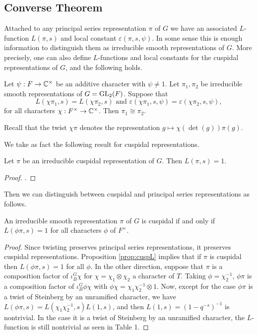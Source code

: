 \subsection{Converse Theorem}

Attached to any principal series representation $\pi$ of $G$ we have an associated $L$-function $L(\pi,s)$ and local constant $\varepsilon(\pi,s,\psi)$. In some sense this is enough information to distinguish them as irreducible smooth representations of $G$. More precisely, one can also define $L$-functions and local constants for the cuspidal representations of $G$, and the following holds.

\begin{thm}\label{thm:converse}
    Let $\psi:F \to \mathbb{C}^\times$ be an additive character with $\psi \neq 1$. Let $\pi_1,\pi_2$ be irreducible smooth representations of $G=\mathrm{GL}_2(F)$. Suppose that 
    $$L(\chi\pi_1,s)=L(\chi\pi_2,s) \text{   and   } \varepsilon(\chi\pi_1,s,\psi) = \varepsilon(\chi\pi_2,s,\psi),$$ for all characters $\chi :F^\times \to \mathbb{C}^\times$. Then $\pi_1 \cong \pi_2$.
\end{thm}

Recall that the twist $\chi\pi$ denotes the representation $g \mapsto \chi(\det(g))\pi(g)$.

We take as fact the following result for cuspidal representations.

\begin{prop}\label{prop:cuspL}
    Let $\pi$ be an irreducible cuspidal representation of $G$. Then $L(\pi,s)=1$.
\end{prop}
\begin{proof}
    \cite[Corollary 24.5]{BH1}.
\end{proof}

Then we can distinguish between cuspidal and principal series representations as follows.

\begin{prop}\label{prop:twistL}
    An irreducible smooth  representation $\pi$ of $G$ is cuspidal if and only if $L(\phi\pi,s)=1$ for all characters $\phi$ of $F^\times$.
\end{prop}
\begin{proof}
    Since twisting preserves principal series representations, it preserves cuspidal representations. Proposition \ref{prop:cuspL} implies that if $\pi$ is cuspidal then $L(\phi\pi,s)=1$ for all $\phi$. In the other direction, suppose that $\pi$ is a composition factor of $\iota_B^G \chi$ for $\chi= \chi_1\otimes \chi_2$ a character of $T$. Taking $\phi=\chi_2^{-1}$, $\phi\pi$ is a composition factor of $\iota_B^G \phi\chi$ with $\phi\chi = \chi_1\chi_2^{-1} \otimes 1$. Now, except for the case $\phi\pi$ is a twist of Steinberg by an unramified character, we have $L(\phi\pi,s) = L(\chi_1\chi_2^{-1},s)L(1,s)$, and then $L(1,s)=(1-q^{-s})^{-1}$ is nontrivial. In the case it is a twist of Steinberg by an unramified character, the $L$-function is still nontrivial as seen in Table 1.
\end{proof}

